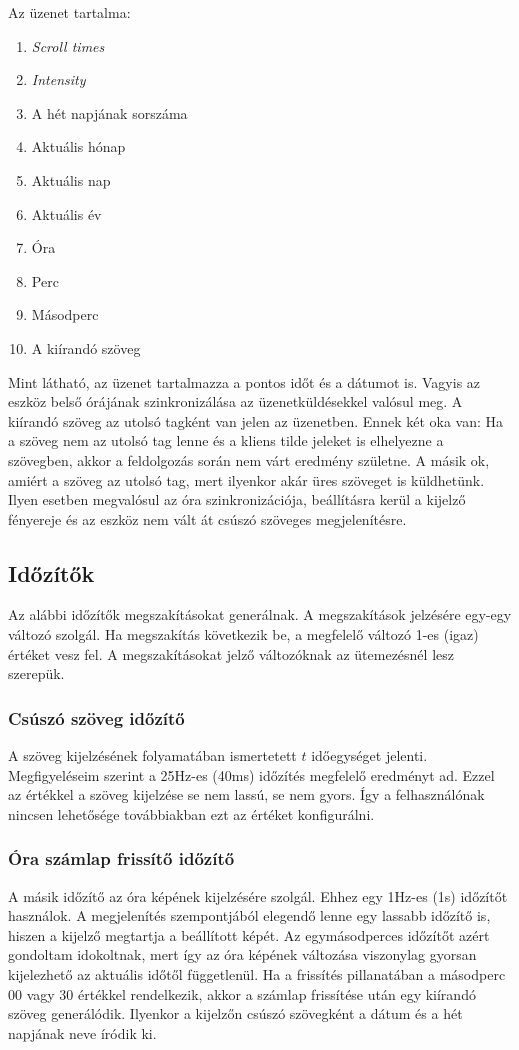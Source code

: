 \documentclass[a4paper, 12pt]{article}
\begin{document}
Az üzenet tartalma:
\begin{enumerate}[nolistsep]
 \item \textit{Scroll times}
 \item \textit{Intensity}
 \item A hét napjának sorszáma
 \item Aktuális hónap
 \item Aktuális nap
 \item Aktuális év
 \item Óra
 \item Perc
 \item Másodperc
 \item A kiírandó szöveg 
\end{enumerate}

Mint látható, az üzenet tartalmazza a pontos időt és a dátumot is. Vagyis az eszköz belső órájának szinkronizálása az üzenetküldésekkel valósul meg. A kiírandó szöveg az utolsó tagként van jelen az üzenetben. Ennek két oka van: Ha a szöveg nem az utolsó tag lenne és a kliens tilde jeleket is elhelyezne a szövegben, akkor a feldolgozás során nem várt eredmény születne. A másik ok, amiért a szöveg az utolsó tag, mert ilyenkor akár üres szöveget is küldhetünk. Ilyen esetben megvalósul az óra szinkronizációja, beállításra kerül a kijelző fényereje és az eszköz nem vált át csúszó szöveges megjelenítésre.

\subsection{Időzítők}

Az alábbi időzítők megszakításokat generálnak. A megszakítások jelzésére egy-egy változó szolgál. Ha megszakítás következik be, a megfelelő változó 1-es (igaz) értéket vesz fel. A megszakításokat jelző változóknak az ütemezésnél lesz szerepük.

\subsubsection{Csúszó szöveg időzítő}
A szöveg kijelzésének folyamatában ismertetett $t$ időegységet jelenti. Megfigyeléseim szerint a 25Hz-es (40ms) időzítés megfelelő eredményt ad. Ezzel az értékkel a szöveg kijelzése se nem lassú, se nem gyors. Így a felhasználónak nincsen lehetősége továbbiakban ezt az értéket konfigurálni.

\subsubsection{Óra számlap frissítő időzítő}
A másik időzítő az óra képének kijelzésére szolgál. Ehhez egy 1Hz-es (1s) időzítőt használok. A megjelenítés szempontjából elegendő lenne egy lassabb időzítő is, hiszen a kijelző megtartja a beállított képét. Az egymásodperces időzítőt azért gondoltam idokoltnak, mert így az óra képének változása viszonylag gyorsan kijelezhető az aktuális időtől függetlenül.
Ha a frissítés pillanatában a másodperc 00 vagy 30 értékkel rendelkezik, akkor a számlap frissítése után egy kiírandó szöveg generálódik. Ilyenkor a kijelzőn csúszó szövegként a dátum és a hét napjának neve íródik ki.
\end{document}
